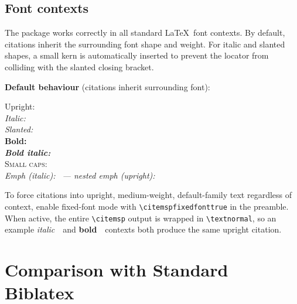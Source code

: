 \documentclass[11pt, a4paper]{article}
\newcommand{\cmd}[1]{\texttt{\textbackslash #1}}
\begin{document}
\subsection{Font contexts}

The package works correctly in all standard \LaTeX\ font contexts.
By default, citations inherit the surrounding font shape and weight.
For italic and slanted shapes, a small kern is automatically inserted to
prevent the locator from colliding with the slanted closing bracket.

\medskip
\noindent\textbf{Default behaviour} (citations inherit surrounding font):

\begin{tcolorbox}[colback=blue!3, colframe=blue!30, boxrule=0.5pt, arc=2pt,
  top=6pt, bottom=6pt, left=10pt, right=10pt]
Upright:~\\[3pt]
\textit{Italic:~}\\[3pt]
\textsl{Slanted:~}\\[3pt]
\textbf{Bold:~}\\[3pt]
\textbf{\textit{Bold italic:~}}\\[3pt]
\textsc{Small caps:~}\\[3pt]
\emph{Emph (italic):~
  --- \emph{nested emph (upright):~}}
\end{tcolorbox}

\noindent To force citations into upright, medium-weight, default-family text regardless of context, enable fixed-font mode with \verb|\citemspfixedfonttrue| in the preamble.  When active, the entire \cmd{citemsp} output is wrapped in \cmd{textnormal}, so an example \textit{italic}~\begingroup\citemspfixedfonttrue{}\endgroup\ and \textbf{bold}~\begingroup\citemspfixedfonttrue{}\endgroup\ contexts both produce the same upright citation.



\section{Comparison with Standard Biblatex}
\end{document}
